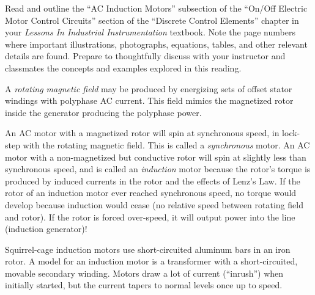 

Read and outline the ``AC Induction Motors'' subsection of the ``On/Off Electric Motor Control Circuits'' section of the ``Discrete Control Elements'' chapter in your {\it Lessons In Industrial Instrumentation} textbook.  Note the page numbers where important illustrations, photographs, equations, tables, and other relevant details are found.  Prepare to thoughtfully discuss with your instructor and classmates the concepts and examples explored in this reading.














A {\it rotating magnetic field} may be produced by energizing sets of offset stator windings with polyphase AC current.  This field mimics the magnetized rotor inside the generator producing the polyphase power.

\vskip 10pt

An AC motor with a magnetized rotor will spin at synchronous speed, in lock-step with the rotating magnetic field.  This is called a {\it synchronous} motor.  An AC motor with a non-magnetized but conductive rotor will spin at slightly less than synchronous speed, and is called an {\it induction} motor because the rotor's torque is produced by induced currents in the rotor and the effects of Lenz's Law.  If the rotor of an induction motor ever reached synchronous speed, no torque would develop because induction would cease (no relative speed between rotating field and rotor).  If the rotor is forced over-speed, it will output power into the line (induction generator)!

Squirrel-cage induction motors use short-circuited aluminum bars in an iron rotor.  A model for an induction motor is a transformer with a short-circuited, movable secondary winding.  Motors draw a lot of current (``inrush'') when initially started, but the current tapers to normal levels once up to speed.

\vskip 10pt

